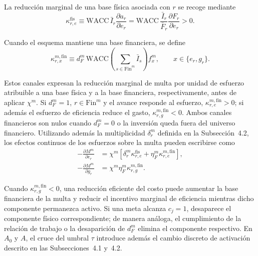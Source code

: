 La reducción marginal de una base física asociada con \(r\) se recoge mediante
\begin{equation}
\label{eq:canal_reduccion_base}
\kappa_{r,e}^{\mathrm{fis}}\equiv\mathrm{WACC}\,\bar I_r\frac{\partial a_r}{\partial e_r}
=\mathrm{WACC}\,\frac{\bar I_r}{\bar F_r}\frac{\partial F_r}{\partial e_r}>0.
\end{equation}

Cuando el esquema mantiene una base financiera, se define
\begin{equation}
\label{eq:canal_financiero_marginal}
\kappa_{r,x}^{m,\mathrm{fin}}
\equiv
d_F^m\,
\mathrm{WACC}
\left(
\sum_{s\in\mathrm{Fin}^m}
\bar I_s
\right)
f_x^m,
\qquad x\in\{e_r,g_r\}.
\end{equation}

Estos canales expresan la reducción marginal de multa por unidad de esfuerzo atribuible a una base física y a la base financiera, respectivamente, antes de aplicar \(\chi^m\). Si \(d_F^m=1\), \(r\in\mathrm{Fin}^m\) y el avance responde al esfuerzo, \(\kappa_{r,e}^{m,\mathrm{fin}}>0\); si además el esfuerzo de eficiencia reduce el gasto, \(\kappa_{r,g}^{m,\mathrm{fin}}<0\). Ambos canales financieros son nulos cuando \(d_F^m=0\) o la inversión queda fuera del universo financiero. Utilizando además la multiplicidad \(\delta_r^m\) definida en la Subsección~4.2, los efectos continuos de los esfuerzos sobre la multa pueden escribirse como
\begin{subequations}
\label{eq:derivadas_multa_esfuerzos}
\begin{align}
-\frac{\partial M^m}{\partial e_r}
&=
\chi^m\left[
\delta_r^m \kappa_{r,e}^{\mathrm{fis}}
+
\eta_F^m \kappa_{r,e}^{m,\mathrm{fin}}
\right],
\label{eq:derivada_multa_ejecucion}\\
-\frac{\partial M^m}{\partial g_r}
&=
\chi^m\eta_F^m \kappa_{r,g}^{m,\mathrm{fin}}.
\label{eq:derivada_multa_eficiencia}
\end{align}
\end{subequations}

Cuando \(\kappa_{r,g}^{m,\mathrm{fin}}<0\), una reducción eficiente del costo puede aumentar la base financiera de la multa y reducir el incentivo marginal de eficiencia mientras dicho componente permanezca activo. Si una meta alcanza \(c_j=1\), desaparece el componente físico correspondiente; de manera análoga, el cumplimiento de la relación de trabajo o la desaparición de \(d_F^m\) elimina el componente respectivo. En \(A_0\) y \(A\), el cruce del umbral \(\tau\) introduce además el cambio discreto de activación descrito en las Subsecciones~4.1 y~4.2.

